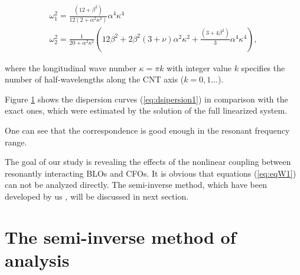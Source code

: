 \begin{eqnarray}\label{eq:dsipersion1}
\omega_{1}^{2}   =\frac{\left(12+\beta ^2\right) }{12 \left(2+\alpha^{2} \kappa ^2 \right)} \alpha^{4}\kappa ^4 \\
\omega _2^2   =\frac{1}{20+\alpha^2 \kappa ^2}\left( 12 \beta ^2+2 \beta ^2 \left( 3+ \nu \right) \alpha^2 \kappa^2 +  \frac{\left(3+4 \beta ^2 \right)}{3} \alpha^4 \kappa^4 \right), \nonumber
\end{eqnarray}

where the longitudinal wave number $\kappa= \pi k$ with integer value $k$ specifies the number of half-wavelengths along the CNT axis ($k  = 0,1\dots$).

Figure \ref{fig:DScompare} shows the dispersion curves (\ref{eq:dsipersion1}) in comparison with the exact ones, which were estimated by the solution of the full linearized system.

\begin{figure}
\label{fig:DScompare}
\end{figure}

One can see that the correspondence is good enough in the resonant frequency range.

The goal of our study is revealing the effects of the nonlinear coupling between resonantly interacting BLOs and CFOs.
It is obvious that equations (\ref{eq:eqW1}) can not be analyzed directly.
The semi-inverse method, which have been developed by us \cite{Kharkov2016,Smirnov2017}, will be discussed in next section.
 
\section{The semi-inverse method of analysis}\label{Method}
